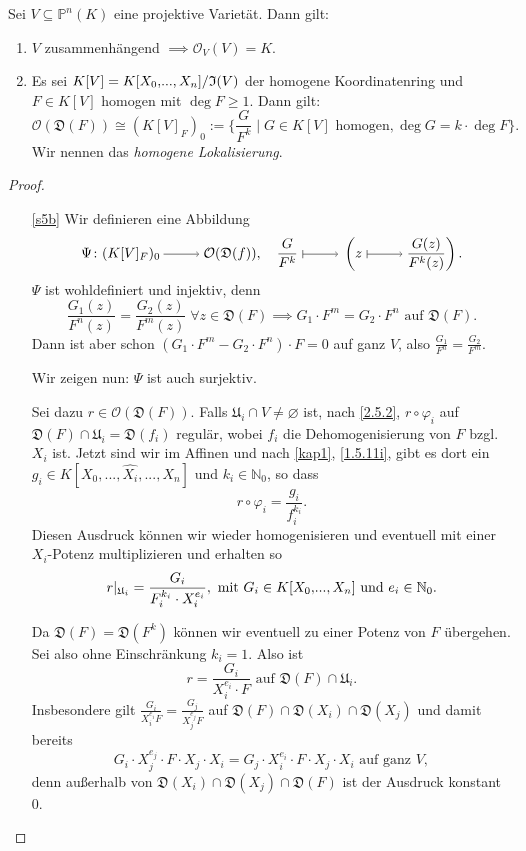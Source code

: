 \documentclass[a4paper,12pt,index=toc]{scrbook}
\theoremstyle{keinenummern} %
\def\I{\mathfrak{I}}
\def\O{\mathcal{O}}
\def\P{\mathbb{P}}
\newcommand{\D}{\mathfrak{D}}
\def\U{\mathfrak{U}}
\newcommand{\leer}{\ensuremath{\varnothing}}
\newcommand{\restrict}[1]{|_{#1}}
\renewcommand{\dotsc}{\ensuremath{\!...}}
\newcommand{\set}[1]{\ensuremath{\mathbb{#1}}}
\newcommand{\N}{\set{N}}
\newcommand{\dach}{\widehat}
\newcommand{\ppolyx}[1][n]{\ensuremath%
  [X_{0},\dotsc,X_{#1}]}
\begin{document}
\begin{satz}\label{satz5}
Sei $V\subseteq\P^{n}(K)$ eine projektive Varietät. Dann gilt:
\begin{enumerate}
\item{} $V$ zusammenhängend $\implies\O_{V}(V)=K$.
\item{} Es sei $K[V]=\Quotient{K\ppolyx}{\I(V)}$ der homogene Koordinatenring und $F\in K[V]$ homogen mit $\deg F\geq 1$. Dann gilt:
\[\O(\D(F))\cong(K[V]_{F})_{0}:=\{\frac{G}{F^{k}}\mid G\in K[V]\text{ homogen}, \deg G = k\cdot\deg F\}.\]
Wir nennen das \emph{homogene Lokalisierung}.
\end{enumerate}\end{satz}
\begin{proof}\begin{enumerate}
\item[\ref{s5b}] Wir definieren eine Abbildung
\[\Psi\colon(K[V]_{F})_{0}\ra\O(\D(f)),\quad\frac{G}{F^{k}}\mapsto\left(z\mapsto\frac{G(z)}{F^{k}(z)}\right).\]
$\Psi$ ist wohldefiniert und injektiv, denn
\[\frac{G_{1}(z)}{F^{n}(z)}=\frac{G_{2}(z)}{F^{m}(z)}\;\forall z\in\D(F)\implies G_{1}\cdot F^{m}=G_{2}\cdot F^{n}\text{ auf }\D(F).\]
Dann ist aber schon $(G_{1}\cdot F^{m}-G_{2}\cdot F^{n})\cdot F=0$ auf ganz $V$, also $\frac{G_{1}}{F^{n}}=\frac{G_{2}}{F^{m}}$.

Wir zeigen nun: $\Psi$ ist auch surjektiv.

Sei dazu $r\in\O(\D(F))$. Falls $\U_{i}\cap V\neq\leer$ ist, nach \cref{2.5.2}, $r\circ\varphi_{i}$ auf $\D(F)\cap \U_{i}=\D(f_{i})$ regulär, wobei $f_{i}$ die Dehomogenisierung von $F$ bzgl. $X_{i}$ ist. Jetzt sind wir im Affinen und nach \cref{kap1}, \cref{1.5.11i}, gibt es dort ein $g_{i}\in K[X_{0},\dotsc,\dach{X_{i}},\dotsc,X_{n}]$ und $k_{i}\in\N_{0}$, so dass
\[r\circ\varphi_{i}=\frac{g_{i}}{f_{i}^{k_{i}}}.\]
Diesen Ausdruck können wir wieder homogenisieren und eventuell mit einer $X_{i}$-Potenz multiplizieren und erhalten so
\[r\restrict{\U_{i}}=\frac{G_{i}}{F_{i}^{k_{i}}\cdot X_{i}^{e_{i}}},\text{ mit }G_{i}\in K\ppolyx\text{ und }e_{i}\in\N_{0}.\]

Da $\D(F)=\D(F^{k})$ können wir eventuell zu einer Potenz von $F$ übergehen. Sei also ohne Einschränkung $k_{i}=1$. Also ist
\[r=\frac{G_{i}}{X_{i}^{e_{i}}\cdot F}\text{ auf }\D(F)\cap \U_{i}.\]
Insbesondere gilt $\frac{G_{i}}{X_{i}^{e_{i}}F}=\frac{G_{j}}{X_{j}^{e_{j}}F}$ auf $\D(F)\cap\D(X_{i})\cap\D(X_{j})$ und damit bereits
\begin{equation}\label{s5s}G_{i}\cdot X_{j}^{e_{j}}\cdot F\cdot X_{j}\cdot X_{i}=G_{j}\cdot X_{i}^{e_{i}}\cdot F\cdot X_{j}\cdot X_{i}\text{ auf ganz }V,\tag{$*$}\end{equation}
denn außerhalb von $\D(X_{i})\cap\D(X_{j})\cap\D(F)$ ist der Ausdruck konstant $0$.


\end{enumerate}
\end{proof}
\end{document}
